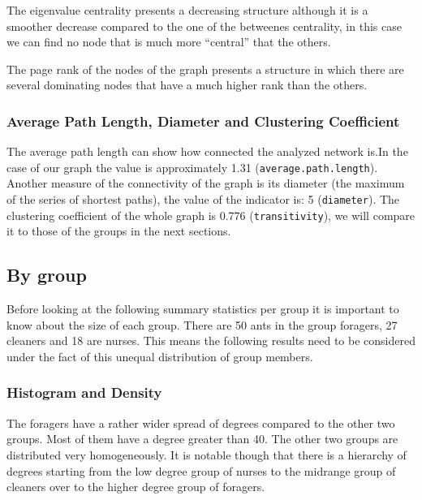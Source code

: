 \documentclass[
]{article}
\begin{document}
The eigenvalue centrality presents a decreasing structure although it is
a smoother decrease compared to the one of the betweenes centrality, in
this case we can find no node that is much more ``central'' that the
others.

The page rank of the nodes of the graph presents a structure in which
there are several dominating nodes that have a much higher rank than the
others.

\hypertarget{average-path-length-diameter-and-clustering-coefficient}{%
\subsubsection{Average Path Length, Diameter and Clustering
Coefficient}\label{average-path-length-diameter-and-clustering-coefficient}}

The average path length can show how connected the analyzed network
is.In the case of our graph the value is approximately 1.31
(\texttt{average.path.length}). Another measure of the connectivity of
the graph is its diameter (the maximum of the series of shortest paths),
the value of the indicator is: 5 (\texttt{diameter}). The clustering
coefficient of the whole graph is 0.776 (\texttt{transitivity}), we will
compare it to those of the groups in the next sections.

\hypertarget{by-group}{%
\subsection{By group}\label{by-group}}

Before looking at the following summary statistics per group it is
important to know about the size of each group. There are 50 ants in the
group foragers, 27 cleaners and 18 are nurses. This means the following
results need to be considered under the fact of this unequal
distribution of group members.

\hypertarget{histogram-and-density}{%
\subsubsection{Histogram and Density}\label{histogram-and-density}}

The foragers have a rather wider spread of degrees compared to the other
two groups. Most of them have a degree greater than 40. The other two
groups are distributed very homogeneously. It is notable though that
there is a hierarchy of degrees starting from the low degree group of
nurses to the midrange group of cleaners over to the higher degree group
of foragers.
\end{document}
